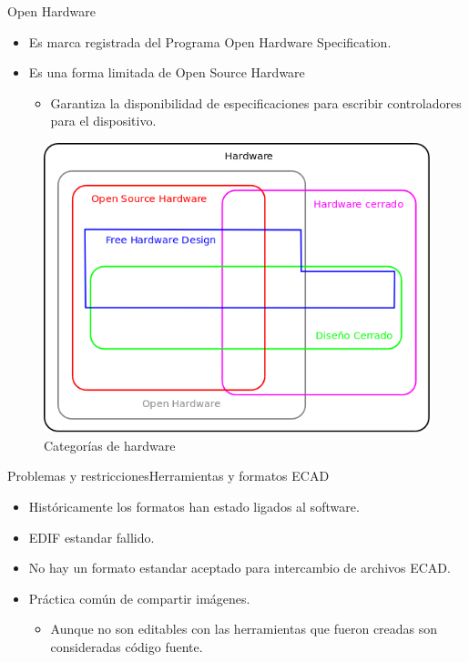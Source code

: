 \documentclass{beamer}
\begin{document}

\begin{frame}{Open Hardware}
  \begin{itemize}
  \item Es marca registrada del Programa Open Hardware Specification.
  \item Es una forma limitada de Open Source Hardware
    \begin{itemize}
    \item Garantiza la disponibilidad de especificaciones para escribir controladores para el dispositivo.
    \end{itemize}
  \end{itemize}
\end{frame}

\begin{frame}
  \begin{figure}
    \includegraphics[scale=0.3]{img/categorias}
    \caption{Categorías de hardware}
    \label{fig:categorias}
  \end{figure}
\end{frame}

\begin{frame}{Problemas y restricciones}{Herramientas y formatos ECAD}
  \begin{itemize}
  \item Históricamente los formatos han estado ligados al software.
  \item EDIF estandar fallido.
  \item No hay un formato estandar aceptado para intercambio de archivos ECAD.
  \item Práctica común de compartir imágenes.
    \begin{itemize}
    \item Aunque no son editables con las herramientas que fueron creadas son consideradas código fuente.
    \end{itemize}
  \end{itemize}
\end{frame}
\end{document}
